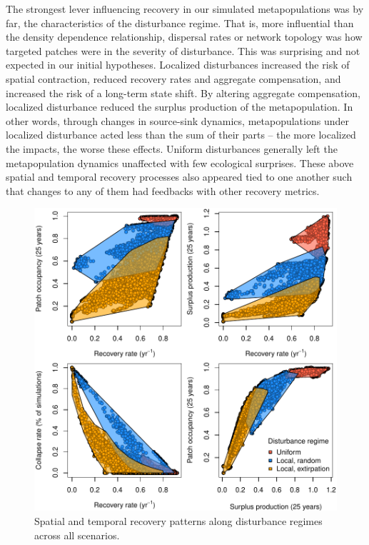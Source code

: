 \documentclass[
]{article}
\begin{document}
The strongest lever influencing recovery in our simulated
metapopulations was by far, the characteristics of the disturbance
regime. That is, more influential than the density dependence
relationship, dispersal rates or network topology was how targeted
patches were in the severity of disturbance. This was surprising and not
expected in our initial hypotheses. Localized disturbances increased the
risk of spatial contraction, reduced recovery rates and aggregate
compensation, and increased the risk of a long-term state shift. By
altering aggregate compensation, localized disturbance reduced the
surplus production of the metapopulation. In other words, through
changes in source-sink dynamics, metapopulations under localized
disturbance acted less than the sum of their parts -- the more localized
the impacts, the worse these effects. Uniform disturbances generally
left the metapopulation dynamics unaffected with few ecological
surprises. These above spatial and temporal recovery processes also
appeared tied to one another such that changes to any of them had
feedbacks with other recovery metrics.

\begin{figure}[H]

{\centering \includegraphics{Managing_for_ecological_surprises_in_metapopulations_files/figure-latex/disturbance regime-1} 

}

\caption{Spatial and temporal recovery patterns along disturbance regimes across all scenarios.}\label{fig:disturbance regime}
\end{figure}
\newpage
\end{document}
